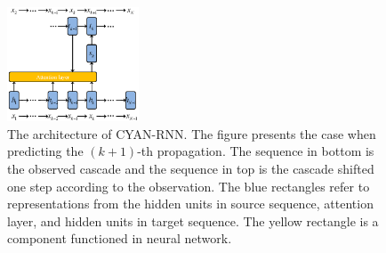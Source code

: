 \begin{figure}[t]
\centering
\includegraphics[width=0.35\textwidth]{figs/cyanrnn_framework.png}
\caption{The architecture of CYAN-RNN. The figure presents the case when
predicting the $(k+1)$-th propagation. The sequence in bottom is the observed
cascade and the sequence in top is the cascade shifted one step
according to the observation. The blue rectangles refer to representations from
the hidden units in source sequence, attention layer, and hidden units in
target sequence. The yellow rectangle is a component functioned in neural
network.}
\label{fig:cyrnn_frame}
\end{figure}

